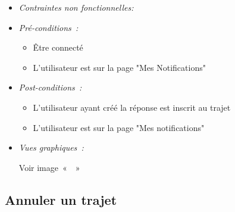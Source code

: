 \begin{itemize}
\item \textit{Contraintes non fonctionnelles:}

\item \textit{Pré-conditions~:}
\begin{itemize}
        \item Être connecté
        \item L'utilisateur est sur la page "Mes Notifications"
    \end{itemize}

\item \textit{Post-conditions~:}
\begin{itemize}
        \item L'utilisateur ayant créé la réponse est inscrit au trajet
        \item L'utilisateur est sur la page "Mes notifications"
    \end{itemize}
    
    \item \textit{Vues graphiques~:}
    
    Voir image~«~~»

\end{itemize}


\subsection{Annuler un trajet}\label{subsec:annuler-trajet}


